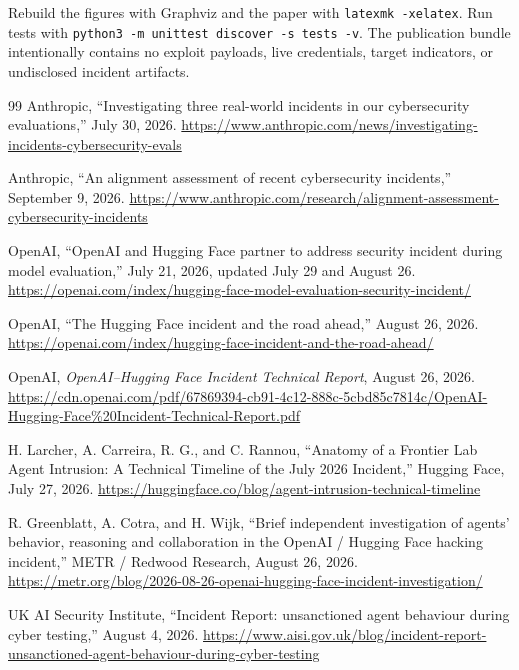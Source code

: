 \documentclass[11pt,letterpaper]{article}
\newcommand{\code}[1]{\texttt{#1}}
\begin{document}
Rebuild the figures with Graphviz and the paper with \code{latexmk -xelatex}. Run tests with \code{python3 -m unittest discover -s tests -v}. The publication bundle intentionally contains no exploit payloads, live credentials, target indicators, or undisclosed incident artifacts.

\newpage
{}
{}
\begin{thebibliography}{99}
 Anthropic, ``Investigating three real-world incidents in our cybersecurity evaluations,'' July 30, 2026. \url{https://www.anthropic.com/news/investigating-incidents-cybersecurity-evals}

 Anthropic, ``An alignment assessment of recent cybersecurity incidents,'' September 9, 2026. \url{https://www.anthropic.com/research/alignment-assessment-cybersecurity-incidents}

 OpenAI, ``OpenAI and Hugging Face partner to address security incident during model evaluation,'' July 21, 2026, updated July 29 and August 26. \url{https://openai.com/index/hugging-face-model-evaluation-security-incident/}

 OpenAI, ``The Hugging Face incident and the road ahead,'' August 26, 2026. \url{https://openai.com/index/hugging-face-incident-and-the-road-ahead/}

 OpenAI, \emph{OpenAI--Hugging Face Incident Technical Report}, August 26, 2026. \url{https://cdn.openai.com/pdf/67869394-cb91-4c12-888c-5cbd85c7814c/OpenAI-Hugging-Face%20Incident-Technical-Report.pdf}

 H. Larcher, A. Carreira, R. G., and C. Rannou, ``Anatomy of a Frontier Lab Agent Intrusion: A Technical Timeline of the July 2026 Incident,'' Hugging Face, July 27, 2026. \url{https://huggingface.co/blog/agent-intrusion-technical-timeline}

 R. Greenblatt, A. Cotra, and H. Wijk, ``Brief independent investigation of agents' behavior, reasoning and collaboration in the OpenAI / Hugging Face hacking incident,'' METR / Redwood Research, August 26, 2026. \url{https://metr.org/blog/2026-08-26-openai-hugging-face-incident-investigation/}

 UK AI Security Institute, ``Incident Report: unsanctioned agent behaviour during cyber testing,'' August 4, 2026. \url{https://www.aisi.gov.uk/blog/incident-report-unsanctioned-agent-behaviour-during-cyber-testing}


\end{thebibliography}
\end{document}
